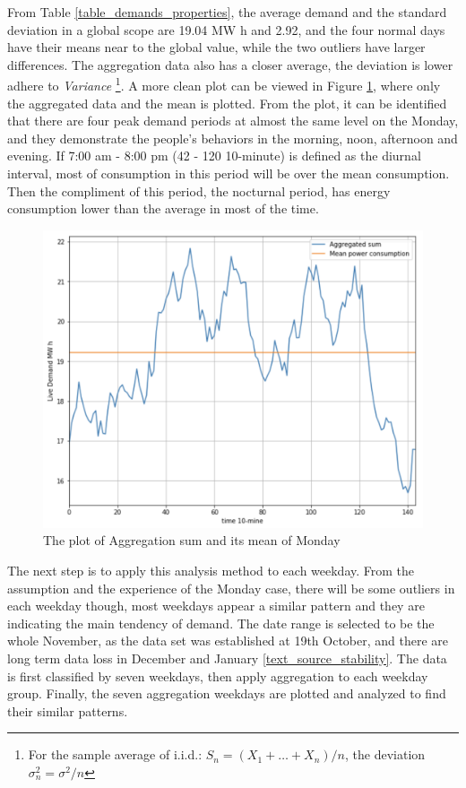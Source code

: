 \documentclass[12pt,a4paper]{report}
\begin{document}
                From Table \ref{table_demands_properties}, the average demand and the standard deviation in a global scope are 19.04 MW h and 2.92, and the four normal days have their means near to the global value, while the two outliers have larger differences. The aggregation data also has a closer average, the deviation is lower adhere to \emph{Variance} \footnote{For the sample average of i.i.d.:  $S_n = (X_1 + \dots + X_n)/n$, the deviation \\$\sigma_n^2 = \sigma^2/n$}.
                A more clean plot can be viewed in Figure \ref{plot_monday_agg}, where only the aggregated data and the mean is plotted. From the plot, it can be identified that there are four peak demand periods at almost the same level on the Monday, and they demonstrate the people's behaviors in the morning, noon, afternoon and evening.
                If 7:00 am - 8:00 pm (42 - 120 10-minute) is defined as the diurnal interval, most of consumption in this period will be over the mean consumption. Then the compliment of this period, the nocturnal period, has energy consumption lower than the average in most of the time.
                \begin{figure}[ht]
                    \centerline{\includegraphics[scale=1.2]{monday_agg}}
                    \caption{The plot of Aggregation sum and its mean of Monday}
                    \label{plot_monday_agg}
                \end{figure}

                The next step is to apply this analysis method to each weekday. From the assumption and the experience of the Monday case, there will be some outliers in each weekday though, most weekdays appear a similar pattern and they are indicating the main tendency of demand. The date range is selected to be the whole November, as the data set was established at 19th October, and there are long term data loss in December and January \ref{text_source_stability}. The data is first classified by seven weekdays, then apply aggregation to each weekday group. Finally, the seven aggregation weekdays are plotted and analyzed to find their similar patterns.
\end{document}
